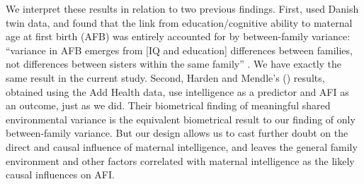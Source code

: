We interpret these results in relation to two previous findings. First, \citet{Rodgers2008AJS} used Danish twin data, and found that the link from education/cognitive ability to maternal age at first birth (AFB) was entirely accounted for by between-family variance: ``variance in AFB emerges from [IQ and education] differences between families, not differences between sisters within the same family'' \citep[][p. S202]{Rodgers2008AJS}. We have exactly the same result in the current study. Second, Harden and Mendle's (\citeyear{harden2011don}) results, obtained using the Add Health data, use intelligence as a predictor and AFI as an outcome, just as we did. Their biometrical finding of meaningful shared environmental variance is the equivalent biometrical result to our finding of only between-family variance.  But our design allows us to cast further doubt on the direct and causal influence of maternal intelligence, and leaves the general family environment and other factors correlated with maternal intelligence as the likely causal influences on AFI.